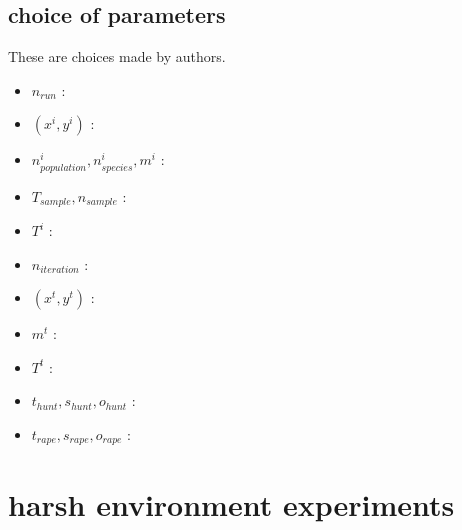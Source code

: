 \documentclass{amsart}
\theoremstyle{definition}
\theoremstyle{remark}
\numberwithin{equation}{section}
\begin{document}
\subsection{choice of parameters}
These are choices made by authors.
\begin{itemize}
\item $n_{run}$ :
\item $(x^i,y^i)$ :
\item $n^i_{population},n^i_{species},m^i$ :
\item $T_{sample},n_{sample}$ :
\item $T^i$ :
\item $n_{iteration}$ :
\item $(x^t,y^t)$ :
\item $m^t$ :
\item $T^t$ : 
\item $t_{hunt},s_{hunt},o_{hunt}$ : 
\item $t_{rape},s_{rape},o_{rape}$ :
\end{itemize} 
\section{harsh environment experiments}


\end{document}
